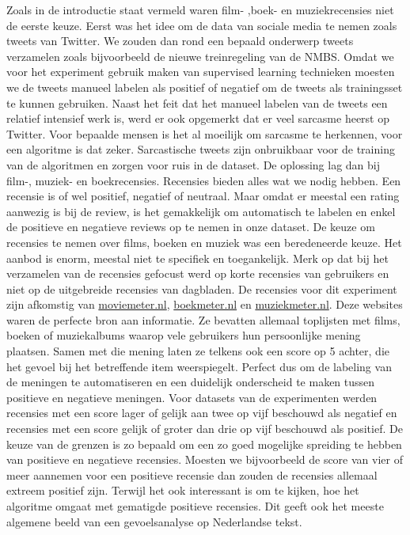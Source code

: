 Zoals in de introductie staat vermeld waren film- ,boek- en muziekrecensies niet de eerste keuze. Eerst was het idee om de data van sociale media te nemen zoals tweets van Twitter. We zouden dan rond een bepaald onderwerp tweets verzamelen zoals bijvoorbeeld de nieuwe treinregeling van de NMBS. Omdat we voor het experiment gebruik maken van supervised learning technieken moesten we de tweets manueel labelen als positief of negatief om de tweets als trainingsset te kunnen gebruiken. Naast het feit dat het manueel labelen van de tweets een relatief intensief werk is, werd er ook opgemerkt dat er veel sarcasme heerst op Twitter. Voor bepaalde mensen is het al moeilijk om sarcasme te herkennen, voor een algoritme is dat zeker. Sarcastische tweets zijn onbruikbaar voor de training van de algoritmen en zorgen voor ruis in de dataset. De oplossing lag dan bij film-, muziek- en boekrecensies. Recensies bieden alles wat we nodig hebben. Een recensie is of wel positief, negatief of neutraal. Maar omdat er meestal een rating aanwezig is bij de review, is het gemakkelijk om automatisch te labelen en enkel de positieve en negatieve reviews op te nemen in onze dataset. De keuze om recensies te nemen over films, boeken en muziek was een beredeneerde keuze. Het aanbod is enorm, meestal niet te specifiek en toegankelijk. Merk op dat bij het verzamelen van de recensies gefocust werd op korte recensies van gebruikers en niet op de uitgebreide recensies van dagbladen. De recensies voor dit experiment zijn afkomstig van \url{moviemeter.nl}, \url{boekmeter.nl} en \url{muziekmeter.nl}. Deze websites waren de perfecte bron aan informatie. Ze bevatten allemaal toplijsten met films, boeken of muziekalbums waarop vele gebruikers hun persoonlijke mening plaatsen. Samen met die mening laten ze telkens ook een score op 5 achter, die het gevoel bij het betreffende item weerspiegelt. Perfect dus om de labeling van de meningen te automatiseren en een duidelijk onderscheid te maken tussen positieve en negatieve meningen. Voor datasets van de experimenten werden recensies met een score lager of gelijk aan twee op vijf beschouwd als negatief en recensies met een score gelijk of groter dan drie op vijf beschouwd als positief. De keuze van de grenzen is zo bepaald om een zo goed mogelijke spreiding te hebben van positieve en negatieve recensies. Moesten we bijvoorbeeld de score van vier of meer aannemen voor een positieve recensie dan zouden de recensies allemaal extreem positief zijn. Terwijl het ook interessant is om te kijken, hoe het algoritme omgaat met gematigde positieve recensies. Dit geeft ook het meeste algemene beeld van een gevoelsanalyse op Nederlandse tekst.  
